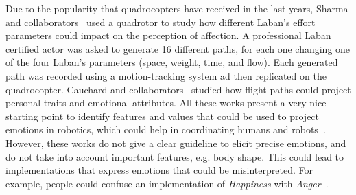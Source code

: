 Due to the popularity that quadrocopters have received in the last years, Sharma and collaborators~\cite{Sharma2013} used a quadrotor to study how different Laban's effort~\cite{Laban1968} parameters could impact on the perception of affection. A professional Laban certified actor was asked to generate 16 different paths, for each one changing one of the four Laban's parameters (space, weight, time, and flow). Each generated path was recorded using a motion-tracking system ad then replicated on the quadrocopter. Cauchard and collaborators~\cite{Cauchard2016} studied how flight paths could project personal traits and emotional attributes. All these works present a very nice starting point to identify features and values that could be used to project emotions in robotics, which could help in coordinating humans and robots~\cite{Novika2015}. However, these works do not give a clear guideline to elicit precise emotions, and do not take into account important features, e.g. body shape. This could lead to implementations that express emotions that could be misinterpreted. For example, people could confuse an implementation of \textit{Happiness} with \textit{Anger}~\cite{Angel2016}.
